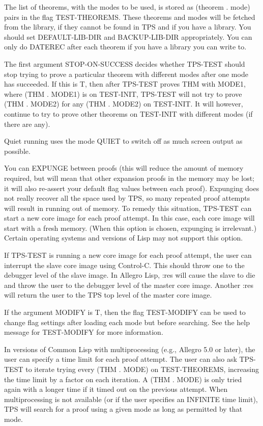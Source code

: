 \begin{description}
The list of theorems, with the modes to be used, is stored as (theorem . mode) 
pairs in the flag TEST-THEOREMS. These theorems and modes will be fetched from
the library, if they cannot be found in TPS and if you have a library. You 
should set DEFAULT-LIB-DIR and BACKUP-LIB-DIR appropriately. You can only do
DATEREC after each theorem if you have a library you can write to. 

The first argument STOP-ON-SUCCESS decides whether TPS-TEST should stop
trying to prove a particular theorem with different modes after one
mode has succeeded.  If this is T, then after TPS-TEST proves THM with MODE1,
where (THM . MODE1) is on TEST-INIT, TPS-TEST will not try to prove (THM . MODE2)
for any (THM . MODE2) on TEST-INIT.  It will however, continue to try to prove
other theorems on TEST-INIT with different modes (if there are any).

Quiet running uses the mode QUIET to switch off as much screen output as possible.

You can EXPUNGE between proofs (this will reduce the amount of memory
required, but will mean that other expansion proofs in the memory may
be lost; it will also re-assert your default flag values between each
proof).  Expunging does not really recover all the space used by TPS,
so many repeated proof attempts will result in running out of memory.
To remedy this situation, TPS-TEST can start a new core image for each
proof attempt.  In this case, each core image will start with a fresh
memory.  (When this option is chosen, expunging is irrelevant.)
Certain operating systems and versions of Lisp may not support
this option.

If TPS-TEST is running a new core image for each proof attempt, the
user can interrupt the slave core image using Control-C.  This should
throw one to the debugger level of the slave image.  In Allegro Lisp,
:res will cause the slave to die and throw the user to the debugger
level of the master core image.  Another :res will return the user to
the TPS top level of the master core image.

If the argument MODIFY is T, then the flag TEST-MODIFY can be 
used to change flag settings after loading each mode but before
searching.  See the help message for TEST-MODIFY for more information.

In versions of Common Lisp with multiprocessing (e.g., Allegro 5.0 or
later), the user can specify a time limit for each proof attempt.  The
user can also ask TPS-TEST to iterate trying every (THM . MODE) on
TEST-THEOREMS, increasing the time limit by a factor on each
iteration.  A (THM . MODE) is only tried again with a longer time if
it timed out on the previous attempt.  When multiprocessing is not
available (or if the user specifies an INFINITE time limit), TPS will
search for a proof using a given mode as long as permitted by that
mode.


\end{description}
